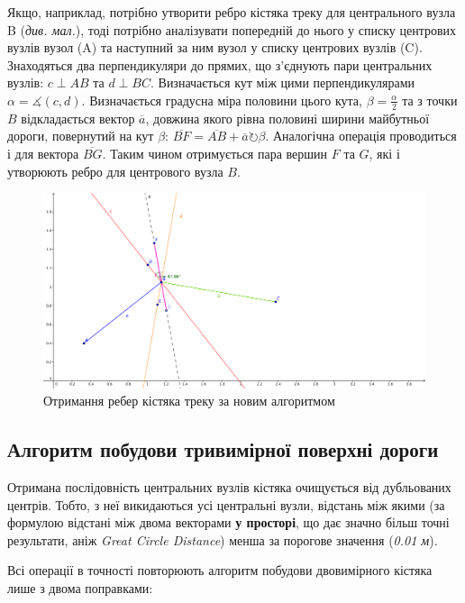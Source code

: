 \documentclass[simple,a4paper,14pt,ukrainian,utf8]{eskdtext}
\begin{document}
		Якщо, наприклад, потрібно утворити ребро кістяка треку для центрального вузла B (\textit{див. мал.}), тоді потрібно аналізувати попередній до нього у списку центрових вузлів вузол (A) та наступний за ним вузол у списку центрових вузлів (C). Знаходяться два перпендикуляри до прямих, що з’єднують пари центральних вузлів: $c \perp AB$ та $d \perp BC$. Визначається кут між цими перпендикулярами $\alpha = \measuredangle(c, d)$. Визначається градусна міра половини цього кута, $\beta = \frac{\alpha}{2}$ та з точки $B$ відкладається вектор $\overline{a}$, довжина якого рівна половині ширини майбутньої дороги, повернутий на кут $\beta$: $\overline{BF} = \overline{AB} + \overline{a} \circlearrowright \beta$. Аналогічна операція проводиться і для вектора $\overline{BG}$. Таким чином отримується пара вершин $F$ та $G$, які і утворюють ребро для центрового вузла $B$.
		
		\vspace{3em}
		\begin{figure}
			\centering \includegraphics[scale=0.65]{images/perpendicular_1_1.png}
			\caption{Отримання ребер кістяка треку за новим алгоритмом}
		\end{figure}
	
	\subsection{Алгоритм побудови тривимірної поверхні дороги}
	
		Отримана послідовність центральних вузлів кістяка очищується від дубльованих центрів. Тобто, з неї викидаються усі центральні вузли, відстань між якими (за формулою відстані між двома векторами \textbf{у просторі}, що дає значно більш точні результати, аніж \textit{Great Circle Distance}) менша за порогове значення (\textit{0.01 м}).
		
		Всі операції в точності повторюють алгоритм побудови двовимірного кістяка лише з двома поправками:
		
\end{document}
